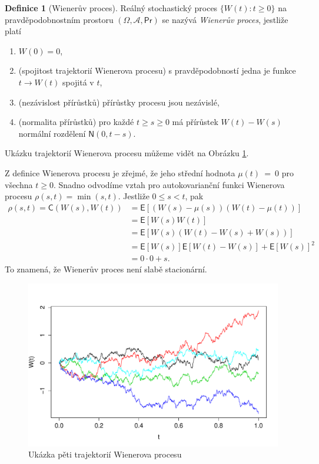 \documentclass[a4paper,12pt]{report}
\theoremstyle{definition} \newtheorem{definice}[veta]{Definice}
\theoremstyle{remark}
\begin{document}
\begin{definice}[Wienerův proces]\label{WP_def}
Reálný stochastický proces $\{W(t):t\ge0\}$ na pravděpodobnostním prostoru $(\Omega,\mathcal{A},\mathsf{Pr})$ se nazývá \textit{Wienerův proces}, jestliže platí
\begin{enumerate}
\item$W(0)=0$, 
\item(spojitost trajektorií Wienerova procesu) s pravděpodobností jedna je funkce $t\to W(t)$ spojitá v $t$,
\item(nezávislost přírůstků) přírůstky procesu jsou nezávislé,
\item(normalita přírůstků) pro každé $t\ge s\ge0$ má přírůstek $W(t)-W(s)$ normální rozdělení $\mathsf{N}(0, t-s)$.
\end{enumerate}
\end{definice}

Ukázku trajektorií Wienerova procesu můžeme vidět na Obrázku \ref{WP_graf}.

Z definice Wienerova procesu je zřejmé, že jeho střední hodnota $\mu(t)~=~0$ pro všechna $t\ge0$.
Snadno odvodíme vztah pro autokovarianční funkci Wienerova procesu $\rho(s,t)=\min(s,t)$.
Jestliže $0\leq s<t$, pak
\begin{align*}
\rho(s,t)=\mathsf{C}(W(s),W(t))&=\mathsf{E}{\left[(W(s)-\mu(s))(W(t)-\mu(t))\right]} \\
&=\mathsf{E}{\left[W(s)W(t)\right]}  \\
&=\mathsf{E}{\left[W(s)(W(t)-W(s)+W(s))\right]} \\
&=\mathsf{E}{\left[W(s)\right]}\mathsf{E}{\left[W(t)-W(s)\right]}+\mathsf{E}{\left[W(s)\right]}^2 \\
&=0\cdot0+s.
\end{align*}
To znamená, že Wienerův proces není slabě stacionární.

\begin{figure}[!htbp]
  \centering 
	\includegraphics[width=13.5cm, clip, trim= 0 15 25 40]{IMG/WP_v2.pdf}
  \caption{Ukázka pěti trajektorií Wienerova procesu}  \label{WP_graf}
\end{figure}
\end{document}
